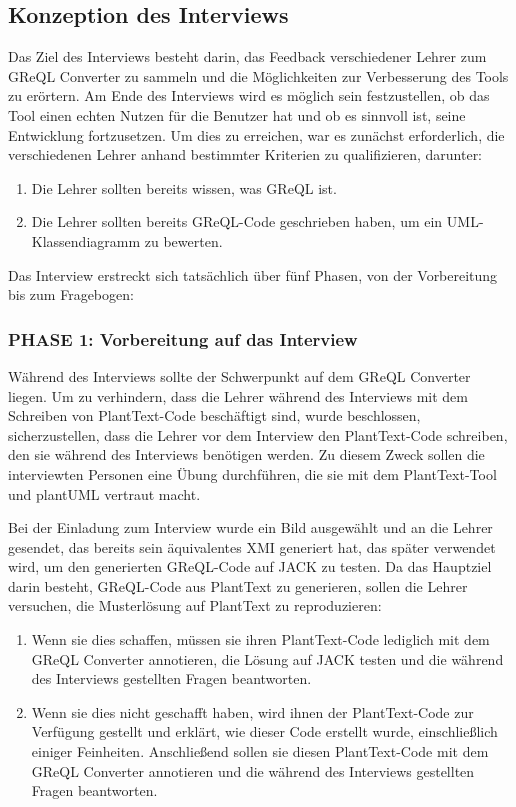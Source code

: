 \subsection{Konzeption des Interviews}

Das Ziel des Interviews besteht darin, das Feedback verschiedener Lehrer zum GReQL Converter zu sammeln und die
Möglichkeiten zur Verbesserung des Tools zu erörtern. Am Ende des Interviews wird es möglich sein festzustellen, ob
das Tool einen echten Nutzen für die Benutzer hat und ob es sinnvoll ist, seine Entwicklung fortzusetzen. Um dies zu
erreichen, war es zunächst erforderlich, die verschiedenen Lehrer anhand bestimmter Kriterien zu qualifizieren,
darunter:

\begin{enumerate}
    \item Die Lehrer sollten bereits wissen, was GReQL ist.
    \item Die Lehrer sollten bereits GReQL-Code geschrieben haben, um ein UML-Klassendiagramm zu bewerten.
\end{enumerate}

Das Interview erstreckt sich tatsächlich über fünf Phasen, von der Vorbereitung bis zum Fragebogen:

\subsubsection{PHASE 1: Vorbereitung auf das Interview}

Während des Interviews sollte der Schwerpunkt auf dem GReQL Converter liegen. Um zu verhindern, dass die Lehrer
während des Interviews mit dem Schreiben von PlantText-Code beschäftigt sind, wurde beschlossen, sicherzustellen,
dass die Lehrer vor dem Interview den PlantText-Code schreiben, den sie während des Interviews benötigen werden. Zu
diesem Zweck sollen die interviewten Personen eine Übung durchführen, die sie mit dem PlantText-Tool und plantUML
vertraut macht.

Bei der Einladung zum Interview wurde ein Bild ausgewählt und an die Lehrer gesendet, das bereits sein äquivalentes XMI
generiert hat, das später verwendet wird, um den generierten GReQL-Code auf JACK zu testen. Da das Hauptziel darin
besteht, GReQL-Code aus PlantText zu generieren, sollen die Lehrer versuchen, die Musterlösung auf PlantText zu
reproduzieren:

\begin{enumerate}
    \item Wenn sie dies schaffen, müssen sie ihren PlantText-Code lediglich mit dem GReQL Converter annotieren, die
Lösung auf JACK testen und die während des Interviews gestellten Fragen beantworten.
    \item Wenn sie dies nicht geschafft haben, wird ihnen der PlantText-Code zur Verfügung gestellt und erklärt, wie
dieser Code erstellt wurde, einschließlich einiger Feinheiten. Anschließend sollen sie diesen PlantText-Code mit dem
GReQL Converter annotieren und die während des Interviews gestellten Fragen beantworten.
\end{enumerate}

